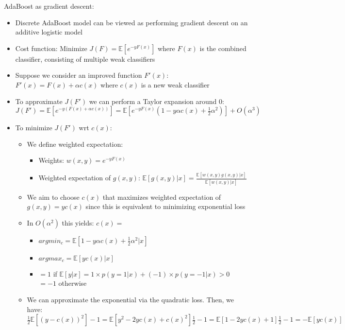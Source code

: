 AdaBoost as gradient descent:
\begin{itemize}
    \item Discrete AdaBoost model can be viewed as performing gradient descent on an additive logistic model
    \item Cost function: Minimize $J(F) = \mathbb{E} [ e^{-y F(x)} ]$ where $F(x)$ is the combined classifier, consisting of multiple weak classifiers
    \item Suppose we consider an improved function $F'(x)$: $F'(x) = F(x) + \alpha c(x)$ where $c(x)$ is a new weak classifier
    \item To approximate $J(F')$ we can perform a Taylor expansion around 0: $J(F') = \mathbb{E} [ e^{-y (F(x) + \alpha c(x))} ] = \mathbb{E} [ e^{-y F(x)} (1 - y \alpha c(x) + \frac{1}{2}\alpha^2) ] + O(\alpha^3)$
    \item To minimize $J(F')$ wrt $c(x)$:
    \begin{itemize}
        \item We define weighted expectation:
        \begin{itemize}
            \item Weights: $w(x,y) = e^{-y F(x)}$
            \item Weighted expectation of $g(x,y)$: $\mathbb{E} [g(x,y) | x] = \frac{ \mathbb{E} [w(x,y) g(x,y) | x] }{ \mathbb{E} [w(x,y) | x] }$
        \end{itemize}
        \item We aim to choose $c(x)$ that maximizes weighted expectation of $g(x,y) = y c(x)$ since this is equivalent to minimizing exponential loss
        \item In $O(\alpha^2)$ this yields: $c(x) =$ \begin{itemize}
            \item $argmin_c = \mathbb{E} [ 1 - y \alpha c(x) + \frac{1}{2}\alpha^2 | x ]$
            \item $argmax_c = \mathbb{E} [ y c(x) | x ]$
            \item $= 1$ if $\mathbb{E} [y|x] = 1 \times p(y=1|x) + (-1) \times p(y=-1|x) > 0$\\
            $= -1$ otherwise
        \end{itemize}
        \item We can approximate the exponential via the quadratic loss. Then, we have: $\frac{1}{2} \mathbb{E} [ (y - c(x))^2 ] - 1 = \mathbb{E} [y^2 - 2yc(x) + c(x)^2] \frac{1}{2} - 1 = \mathbb{E} [1 - 2yc(x) + 1] \frac{1}{2} - 1 =  - \mathbb{E} [yc(x)]$

\end{itemize}
\end{itemize}
